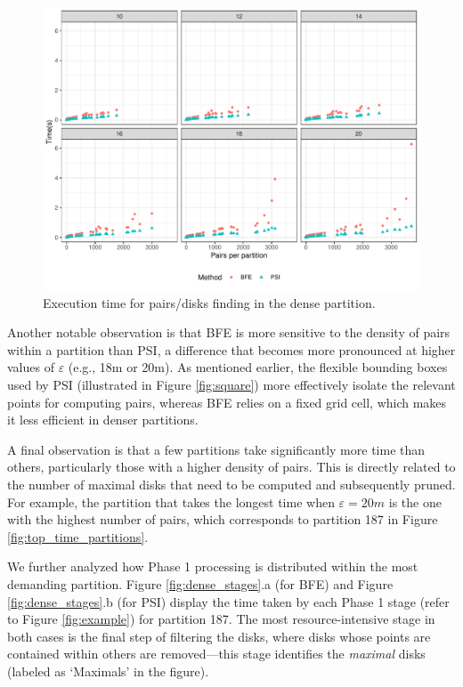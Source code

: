 \begin{figure}
    \centering
    \includegraphics[width=0.85\linewidth]{figures/plots/04_pairs_performance/pairs_performance.pdf}
    \caption{Execution time for pairs/disks finding in the dense partition.}
    \label{fig:pairs_performance}
\end{figure}

Another notable observation is that BFE is more sensitive to the density of pairs within a partition than PSI, a difference that becomes more pronounced at higher values of $\varepsilon$ (e.g., 18m or 20m). As mentioned earlier, the flexible bounding boxes used by PSI (illustrated in Figure \ref{fig:square}) more effectively isolate the relevant points for computing pairs, whereas BFE relies on a fixed grid cell, which makes it less efficient in denser partitions.

A final observation is that a few partitions take significantly more time than others, particularly those with a higher density of pairs. This is directly related to the number of maximal disks that need to be computed and subsequently pruned. For example, the partition that takes the longest time when $\varepsilon = 20m$ is the one with the highest number of pairs, which corresponds to partition 187 in Figure \ref{fig:top_time_partitions}.

We further analyzed how Phase 1 processing is distributed within the most demanding partition. Figure \ref{fig:dense_stages}.a (for BFE) and Figure \ref{fig:dense_stages}.b (for PSI) display the time taken by each Phase 1 stage (refer to Figure \ref{fig:example}) for partition 187. The most resource-intensive stage in both cases is the final step of filtering the disks, where disks whose points are contained within others are removed—this stage identifies the \textit{maximal} disks (labeled as `Maximals' in the figure).

